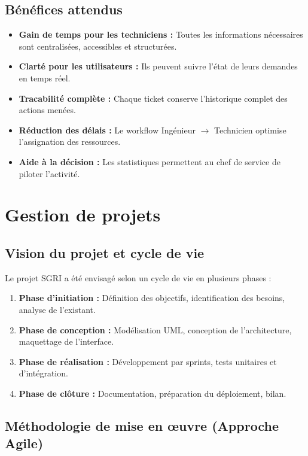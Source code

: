 \documentclass[12pt,a4paper,twoside]{report}
\begin{document}
\subsection{Bénéfices attendus}

\begin{itemize}
    \item \textbf{Gain de temps pour les techniciens :} Toutes les informations nécessaires sont centralisées, accessibles et structurées.
    \item \textbf{Clarté pour les utilisateurs :} Ils peuvent suivre l'état de leurs demandes en temps réel.
    \item \textbf{Tracabilité complète :} Chaque ticket conserve l'historique complet des actions menées.
    \item \textbf{Réduction des délais :} Le workflow Ingénieur $\rightarrow$ Technicien optimise l'assignation des ressources.
    \item \textbf{Aide à la décision :} Les statistiques permettent au chef de service de piloter l'activité.
\end{itemize}

\section{Gestion de projets}

\subsection{Vision du projet et cycle de vie}

Le projet SGRI a été envisagé selon un cycle de vie en plusieurs phases :

\begin{enumerate}
    \item \textbf{Phase d'initiation :} Définition des objectifs, identification des besoins, analyse de l'existant.
    \item \textbf{Phase de conception :} Modélisation UML, conception de l'architecture, maquettage de l'interface.
    \item \textbf{Phase de réalisation :} Développement par sprints, tests unitaires et d'intégration.
    \item \textbf{Phase de clôture :} Documentation, préparation du déploiement, bilan.
\end{enumerate}

\subsection{Méthodologie de mise en œuvre (Approche Agile)}
\end{document}

